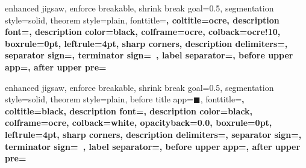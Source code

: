 %
{enhanced jigsaw,%
	enforce breakable,%
	shrink break goal=0.5\baselineskip,%
	segmentation style=solid,%
	theorem style=plain,%
	fonttitle=\sffamily\upshape\bfseries\small,%
	coltitle=ocre,%
	description font=\sffamily\upshape\bfseries\small,%
	description color=black,%
	colframe=ocre,%
	colback=ocre!10,%
	boxrule=0pt,%
	leftrule=4pt,%
	sharp corners,%
	description delimiters={}{},%
	separator sign={\nobreakspace {\color{black}---}},%
	terminator sign={\ },%
	label separator=,
	before upper app={},%
	after upper pre={\popdimen{\parindent}}}%
{}

%
{enhanced jigsaw,%
	enforce breakable,%
	shrink break goal=0.5\baselineskip,%
	segmentation style=solid,%
	theorem style=plain,%
	before title app={{\tiny\ensuremath{\blacksquare}}\nobreakspace},%
	fonttitle=\sffamily\upshape\bfseries\small,%
	coltitle=black,%
	description font=\sffamily\upshape\bfseries\small,%
	description color=black,%
	colframe=ocre,%
	colback=white,%
	opacityback=0.0,%
	boxrule=0pt,%
	leftrule=4pt,%
	sharp corners,%
	description delimiters={}{},%
	separator sign={\nobreakspace {\color{black}---}},%
	terminator sign={\ },%
	label separator=,
	before upper app={},%
	after upper pre={\popdimen{\parindent}}}%
{}

